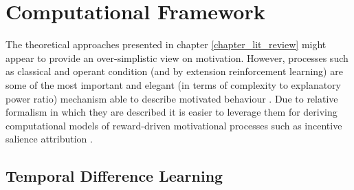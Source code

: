 \section{Computational Framework}
\label{comp_framework}
The theoretical approaches presented in chapter \ref{chapter_lit_review} might appear to provide an over-simplistic view on motivation. However, processes such as classical and operant condition (and by extension reinforcement learning) are some of the most important and elegant (in terms of complexity to explanatory power ratio) mechanism able to describe motivated behaviour \cite{berridge2004motivation, schultz1997neural}. Due to relative formalism in which they are described it is easier to leverage them for deriving computational models of reward-driven motivational processes such as incentive salience attribution \cite{mcclure2003computational,berridge2004motivation,zhang2009neural}. 

\subsection{Temporal Difference Learning}
\label{td_learning}

